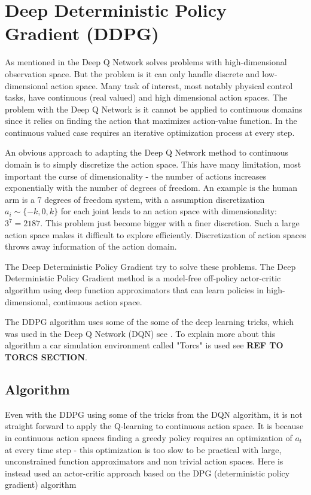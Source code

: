 \section{Deep Deterministic Policy Gradient (DDPG)}
As mentioned in  the Deep Q Network solves problems with high-dimensional observation space. But the problem is it can only handle discrete and low-dimensional action space. Many task of interest, most notably physical control tasks, have continuous (real valued) and high dimensional action spaces. The problem with the Deep Q Network is it cannot be applied to continuous domains since it relies on finding the action that maximizes action-value function. In the continuous valued case requires an iterative optimization process at every step. \cite{DBLP:journals/corr/LillicrapHPHETS15}

An obvious approach to adapting the Deep Q Network method to continuous domain is to simply discretize the action space. This have many limitation, most important the curse of dimensionality - the number of actions increases exponentially with the number of degrees of freedom. An example is the human arm is a 7 degrees of freedom system, with a assumption discretization $a_i \sim  \{-k,0,k\}$ for each joint leads to an action space with dimensionality: $3^7 = 2187$. This problem just become bigger with a finer discretion. Such a large action space makes it difficult to explore efficiently. Discretization of action spaces throws away information of the action domain.

The Deep Deterministic Policy Gradient try to solve these problems. The Deep Deterministic Policy Gradient method is a model-free off-policy actor-critic algorithm using deep function approximators that can learn policies in high-dimensional, continuous action space. 

The DDPG algorithm uses some of the some of the deep learning tricks, which was used in the Deep Q Network (DQN) see . To explain more about this algorithm a car simulation environment called "Torcs" is used see \textbf{REF TO TORCS SECTION}. \cite{DDPG_Torcs} 

\subsection{Algorithm}
Even with the DDPG using some of the tricks from the DQN algorithm, it is not straight forward to apply the Q-learning to continuous action space. It is because in continuous action spaces finding a greedy policy requires an optimization of \textit{$a_t$} at every time step - this optimization is too slow to be practical with large, unconstrained function approximators and non trivial action spaces. Here is instead used an actor-critic approach based on the DPG (deterministic policy gradient) algorithm \cite{DBLP:conf/icml/SilverLHDWR14}

